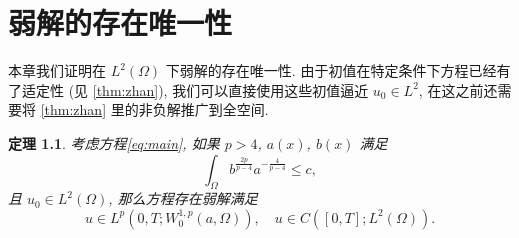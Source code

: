 \documentclass[oneside,longtitle]{LZUthesis}
\newtheorem{theorem}{定理}[chapter]
\theoremstyle{definition}
\numberwithin{equation}{chapter}
\begin{document}
\chapter{弱解的存在唯一性}\label{ch:Existence_and_uniqueness_of_the_weak_solution}
本章我们证明在 $L^2(\Omega)$ 下弱解的存在唯一性.
由于初值在特定条件下方程已经有了适定性 (见 \cref{thm:zhan}),
我们可以直接使用这些初值逼近 $u_0 \in L^2$, 在这之前还需要将 \cref{thm:zhan} 里的非负解推广到全空间.
\begin{theorem}\label{thm:absorb}
	考虑方程\eqref{eq:main}, 如果 $p>4$, $a(x)$, $b(x)$ 满足
	\begin{equation}
		\int_{\Omega} b^{\frac{2p}{p-4}}a^{-\frac{4}{p-4}} \leq c,
	\end{equation}
	且 $u_0 \in L^2(\Omega) $, 那么方程存在弱解满足
	\begin{equation}
		u \in L^p(0, T; W_0^{1,p}(a,\Omega)), \quad u \in C([0, T]; L^2(\Omega)).
	\end{equation}
\end{theorem}
\end{document}
